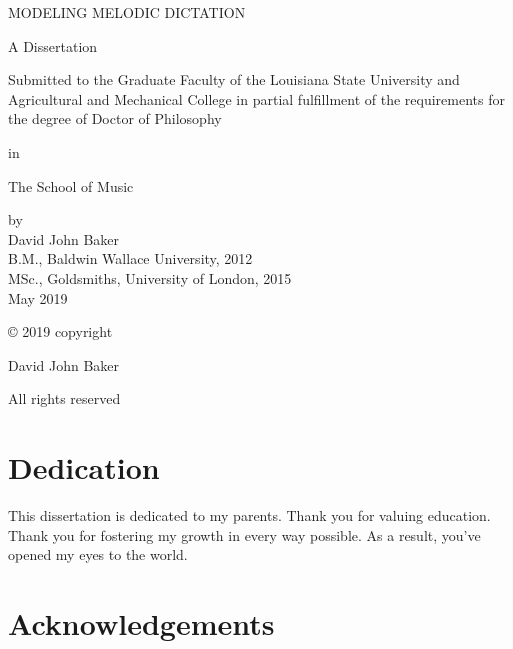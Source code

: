 \newpage\thispagestyle{empty}
\begin{center}
MODELING MELODIC DICTATION
\end{center}
\vspace{1in}
\begin{center}
A Dissertation

Submitted to the Graduate Faculty of the Louisiana State University and Agricultural and Mechanical College in partial fulfillment of the requirements for the degree of Doctor of Philosophy

in

The School of Music
\end{center}
\vspace{1in}
\begin{center}
by\\
David John Baker\\
B.M., Baldwin Wallace University, 2012\\
MSc., Goldsmiths, University of London, 2015\\
May 2019
\end{center}


\setlength{\abovedisplayskip}{-5pt}
\setlength{\abovedisplayshortskip}{-5pt}



\cleardoublepage\newpage\thispagestyle{empty}\null
\cleardoublepage\newpage\thispagestyle{empty}\null

\thispagestyle{empty}

© 2019 copyright

David John Baker

All rights reserved

\cleardoublepage\newpage

\thispagestyle{empty}
\chapter{Dedication}

This dissertation is dedicated to my parents.
Thank you for valuing education.
Thank you for fostering my growth in every way possible.
As a result, you've opened my eyes to the world.

\setlength{\abovedisplayskip}{-5pt}
\setlength{\abovedisplayshortskip}{-5pt}

\chapter{Acknowledgements}


